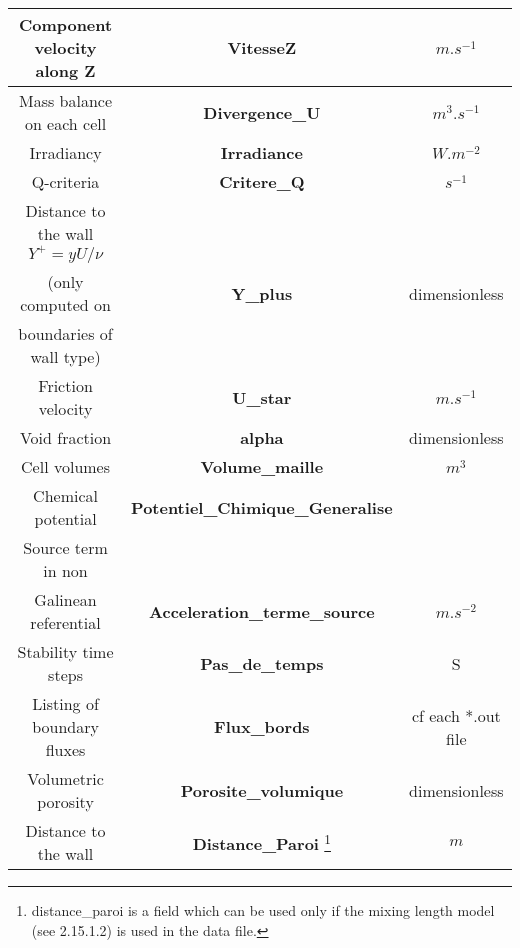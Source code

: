 \begin{longtable}[hcr]{|c|c|c|}
Component velocity along Z                      & \textbf{VitesseZ}                         & $m.s^{-1}$ \\ \hline
Mass balance on each cell                       & \textbf{Divergence\_U}                    & $m^3.s^{-1}$  \\ \hline
Irradiancy                                      & \textbf{Irradiance}                       & $W.m^{-2}$ \\ \hline
Q-criteria                                      & \textbf{Critere\_Q}                       & $s^{-1}$ \\ \hline
Distance to the wall $Y^+=yU/\nu$               &                                           & \\ 
(only computed on                               & \textbf{Y\_plus}                          & dimensionless \\ 
boundaries of wall type)                        &                                           &  \\ \hline
Friction velocity                               & \textbf{U\_star}                          & $m.s^{-1}$ \\ \hline
Void fraction                                   & \textbf{alpha}                            & dimensionless \\ \hline
Cell volumes                                    & \textbf{Volume\_maille}                   & $m^3$ \\ \hline
Chemical potential                              & \textbf{Potentiel\_Chimique\_Generalise}  & \\ \hline
Source term in non                              &                                           & \\
Galinean referential                            & \textbf{Acceleration\_terme\_source}      & $m.s^{-2}$ \\ \hline
Stability time steps                            & \textbf{Pas\_de\_temps}                   & S \\ \hline
Listing of boundary fluxes                      & \textbf{Flux\_bords}                      & cf each *.out file \\ \hline
Volumetric porosity                             & \textbf{Porosite\_volumique}              & dimensionless \\ \hline
Distance to the wall                            & \textbf{Distance\_Paroi} \footnote{distance\_paroi is a field which can be used only if the mixing length model (see 2.15.1.2) is used in the data file.}              & $m$\\ \hline

\end{longtable}
